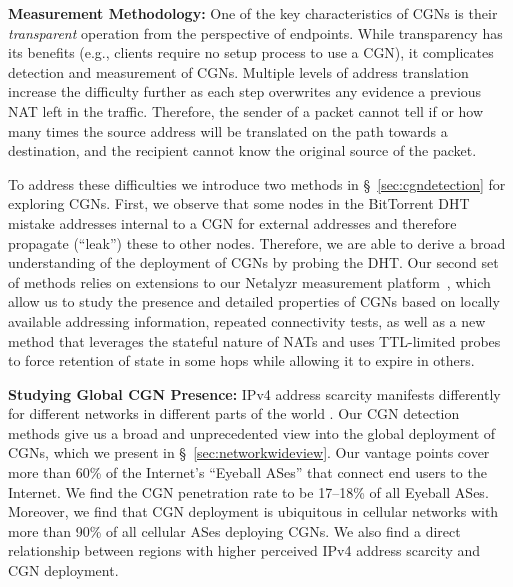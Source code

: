 \documentclass[10pt]{sig-alternate-05-2015}
\newcommand\xref[1]{\S~\ref{#1}}
\newcommand{\parax}[1]{\vspace{0.2em} \noindent \textbf{#1:}}
\begin{document}
\parax{Measurement Methodology}
One of the key characteristics of CGNs is their \textit{transparent} operation
from the perspective of endpoints.  While transparency has its
benefits (e.g., clients require no setup process to use a CGN), it
complicates detection and measurement of CGNs.
Multiple levels of address translation increase the difficulty
further as each step overwrites any evidence a previous NAT left in
the traffic.  Therefore, the sender of a packet cannot tell if or
how many times the source address will be translated on the path
towards a destination, and the recipient cannot know the original
source of the packet.

To address these difficulties we introduce two methods in
\xref{sec:cgndetection} for exploring CGNs.  
First, we observe that some nodes in the BitTorrent DHT mistake addresses 
internal to a CGN for external addresses and therefore propagate (``leak'') 
these to other nodes.  Therefore, we are able to derive a broad understanding of
the deployment of CGNs by probing the DHT.  Our second set of methods relies 
on extensions to our Netalyzr measurement platform~\cite{netalyzr:imc:short},
which allow us to study 
the presence and detailed properties of CGNs based on locally available 
addressing information, repeated connectivity tests,
as well as a new method that 
leverages the stateful nature of NATs and uses TTL-limited probes to force 
retention of state in some hops while allowing it to expire in
others.

\parax{Studying Global CGN Presence}
IPv4 address scarcity manifests differently for different networks
in different parts of the world \cite{RABP14}. Our CGN detection
methods give us a broad and unprecedented view into the global
deployment of CGNs, which we present in
\xref{sec:networkwideview}. Our vantage points cover more than 60\% of
the 
Internet's ``Eyeball ASes'' that connect end users to the Internet.
We find the CGN penetration rate to be 17--18\% of all Eyeball ASes.
Moreover, we find that CGN deployment is ubiquitous in cellular
networks with more than 90\% of all cellular ASes deploying CGNs.
We also find a direct relationship between regions with higher
perceived IPv4 address scarcity and CGN deployment.
\end{document}
